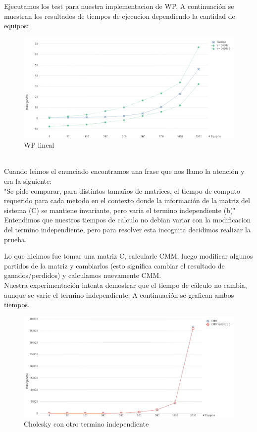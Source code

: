Ejecutamos los test para nuestra implementacion de WP. A continuación se muestran los resultados de tiempos de ejecucion dependiendo la cantidad de equipos: \\


\begin{figure}[H]
\centering
\includegraphics[width=1\textwidth]{IMG/wp lineal.png}
\caption{WP lineal}
\label{fig:WP lineal}
\end{figure}

\\


Cuando leimos el enunciado encontramos una frase que nos llamo la atención y era la siguiente: \\

"Se pide comparar, para distintos tamaños de matrices, el tiempo de computo requerido para cada metodo en el contexto donde la información de la matriz del sistema (C) se mantiene invariante, pero varia el termino independiente (b)"\\

Entendimos que nuestros tiempos de calculo no debian variar con la modificacion del termino independiente, pero para resolver esta incognita decidimos realizar la prueba.

Lo que hicimos fue tomar una matriz C, calcularle CMM, luego modificar algunos partidos de la matriz y cambiarlos (esto significa cambiar el resultado de ganados/perdidos) y calculamos nuevamente CMM. \\

Nuestra experimentación intenta demostrar que el tiempo de cálculo no cambia, aunque se varie el termino independiente.
A continuación se grafican ambos tiempos.\\

\begin{figure}[H]
\centering
\includegraphics[width=1\textwidth]{IMG/Cholesky con otro termino independiente.png}
\caption{Cholesky con otro termino independiente}
\label{fig:Cholesky con otro termino independiente}
\end{figure}
